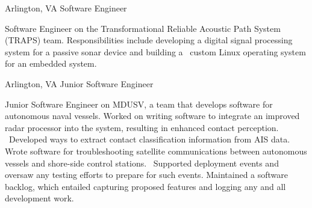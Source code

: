 
        {Arlington, VA}
        {Software Engineer}
        {}{
    
    Software Engineer on the Transformational Reliable Acoustic Path System (TRAPS) team. Responsibilities include developing a digital signal processing system for a passive sonar device and building a \
    custom Linux operating system for an embedded system. \
    
}

        {Arlington, VA}
        {Junior Software Engineer}
        {}{
    
    Junior Software Engineer on MDUSV, a team that develops software for autonomous naval vessels. Worked on writing software to integrate an improved radar processor into the system, resulting in enhanced contact perception. \
    Developed ways to extract contact classification information from AIS data. Wrote software for troubleshooting satellite communications between autonomous vessels and shore-side control stations. \
    Supported deployment events and oversaw any testing efforts to prepare for such events. Maintained a software backlog, which entailed capturing proposed features and logging any and all development work.  \
    
}
